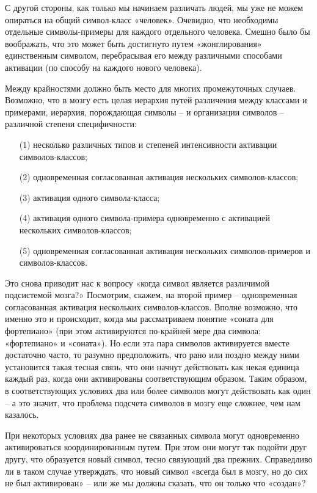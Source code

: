 \documentclass[../main.tex]{subfiles}
\begin{document}
С другой стороны, как только мы начинаем различать людей, мы уже не можем опираться на общий символ-класс «человек». Очевидно, что необходимы отдельные символы-примеры для каждого отдельного человека. Смешно было бы воображать, что это может быть достигнуто путем «жонглирования» единственным символом, перебрасывая его между различными способами активации (по способу на каждого нового человека).

Между крайностями должно быть место для многих промежуточных случаев. Возможно, что в мозгу есть целая иерархия путей различения между классами и примерами, иерархия, порождающая символы \--- и организации символов \--- различной степени специфичности:

\begin{itemize}[label={}, noitemsep, topsep=6pt]
    \item[(1)] несколько различных типов и степеней интенсивности активации символов-классов;
    \item[(2)] одновременная согласованная активация нескольких символов-классов;
    \item[(3)] активация одного символа-класса;
    \item[(4)] активация одного символа-примера одновременно с активацией нескольких символов-классов;
    \item[(5)] одновременная согласованная активация нескольких символов-примеров и символов-классов.
\end{itemize}

Это снова приводит нас к вопросу «когда символ является различимой подсистемой мозга?» Посмотрим, скажем, на второй пример \--- одновременная согласованная активация нескольких символов-классов. Вполне возможно, что именно это и происходит, когда мы рассматриваем понятие «соната для фортепиано» (при этом активируются по-крайней мере два символа: «фортепиано» и «соната»). Но если эта пара символов активируется вместе достаточно часто, то разумно предположить, что рано или поздно между ними установится такая тесная связь, что они начнут действовать как некая единица каждый раз, когда они активированы соответствующим образом. Таким образом, в соответствующих условиях два или более символов могут действовать как один \--- а это значит, что проблема подсчета символов в мозгу еще сложнее, чем нам казалось.

При некоторых условиях два ранее не связанных символа могут одновременно активироваться координированным путем. При этом они могут так подойти друг другу, что образуется новый символ, тесно связующий два прежних. Справедливо ли в таком случае утверждать, что новый символ «всегда был в мозгу, но до сих не был активирован» \--- или же мы должны сказать, что он только что «создан»?
\end{document}
